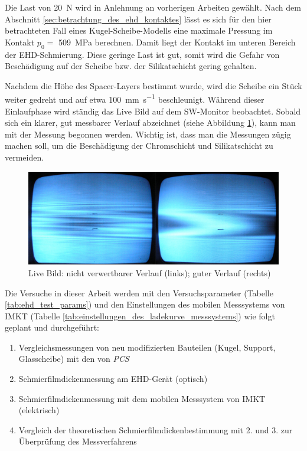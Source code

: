 Die Last von \SI{20}{\newton} wird in Anlehnung an vorherigen Arbeiten gewählt.
Nach dem Abschnitt \ref{sec:betrachtung_des_ehd_kontaktes} lässt es sich für den hier betrachteten Fall eines Kugel-Scheibe-Modells eine maximale Pressung im Kontakt $p_0 =$ \SI{509}{\mega\pascal} berechnen.
Damit liegt der Kontakt im unteren Bereich der EHD-Schmierung.
Diese geringe Last ist gut, somit wird die Gefahr von Beschädigung auf der Scheibe bzw. der Silikatschicht gering gehalten.

Nachdem die Höhe des Spacer-Layers bestimmt wurde, wird die Scheibe ein Stück weiter gedreht und auf etwa \SI[per-mode=symbol]{100}{\mm\per\second} beschleunigt.
Während dieser Einlaufphase wird ständig das Live Bild auf dem SW-Monitor beobachtet.
Sobald sich ein klarer, gut messbarer Verlauf abzeichnet (siehe Abbildung \ref{fig:ehd_live_bild}), kann man mit der Messung begonnen werden.
Wichtig ist, dass man die Messungen zügig machen soll, um die Beschädigung der Chromschicht und Silikatschicht zu vermeiden.
\begin{figure}[htb]
    \centering
    \includegraphics[width=0.8\linewidth]{./images/ehd_live_bild.jpg}
    \caption{Live Bild: nicht verwertbarer Verlauf (links); guter Verlauf (rechts) \cite{mach_2008}}
    \label{fig:ehd_live_bild}
\end{figure}

Die Versuche in dieser Arbeit werden mit den Versuchsparameter (Tabelle \ref{tab:ehd_test_params}) und den Einstellungen des mobilen Messsystems von IMKT (Tabelle \ref{tab:einstellungen_des_ladekurve_messsystems}) wie folgt geplant und durchgeführt:
\begin{enumerate}
    \item Vergleichsmessungen von neu modifizierten Bauteilen (Kugel, Support, Glasscheibe) mit den von \textit{PCS}
    \item Schmierfilmdickenmessung am EHD-Gerät (optisch)
    \item Schmierfilmdickenmessung mit dem mobilen Messsystem von IMKT (elektrisch)
    \item Vergleich der theoretischen Schmierfilmdickenbestimmung mit 2. und 3. zur Überprüfung des Messverfahrens
\end{enumerate}


